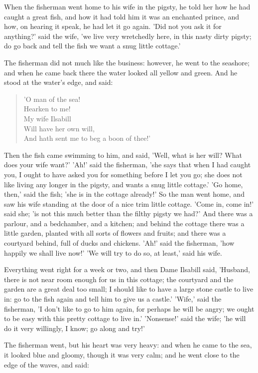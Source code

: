 \documentclass[12pt]{book}
\begin{document}
When the fisherman went home to his wife in the pigsty, he told her
how he had caught a great fish, and how it had told him it was an
enchanted prince, and how, on hearing it speak, he had let it go
again. 'Did not you ask it for anything?' said the wife, 'we live very
wretchedly here, in this nasty dirty pigsty; do go back and tell the
fish we want a snug little cottage.'

The fisherman did not much like the business: however, he went to the
seashore; and when he came back there the water looked all yellow and
green. And he stood at the water's edge, and said:

\begin{verse}
 'O man of the sea!\\
  Hearken to me!\\
  My wife Ilsabill\\
  Will have her own will,\\
  And hath sent me to beg a boon of thee!'
\end{verse}

Then the fish came swimming to him, and said, 'Well, what is her will?
What does your wife want?' 'Ah!' said the fisherman, 'she says that
when I had caught you, I ought to have asked you for something before
I let you go; she does not like living any longer in the pigsty, and
wants a snug little cottage.' 'Go home, then,' said the fish; 'she is
in the cottage already!' So the man went home, and saw his wife
standing at the door of a nice trim little cottage. 'Come in, come
in!' said she; 'is not this much better than the filthy pigsty we
had?' And there was a parlour, and a bedchamber, and a kitchen; and
behind the cottage there was a little garden, planted with all sorts
of flowers and fruits; and there was a courtyard behind, full of ducks
and chickens. 'Ah!' said the fisherman, 'how happily we shall live
now!' 'We will try to do so, at least,' said his wife.

Everything went right for a week or two, and then Dame Ilsabill said,
'Husband, there is not near room enough for us in this cottage; the
courtyard and the garden are a great deal too small; I should like to
have a large stone castle to live in: go to the fish again and tell
him to give us a castle.' 'Wife,' said the fisherman, 'I don't like to
go to him again, for perhaps he will be angry; we ought to be easy
with this pretty cottage to live in.' 'Nonsense!' said the wife; 'he
will do it very willingly, I know; go along and try!'

The fisherman went, but his heart was very heavy: and when he came to
the sea, it looked blue and gloomy, though it was very calm; and he
went close to the edge of the waves, and said:
\end{document}
